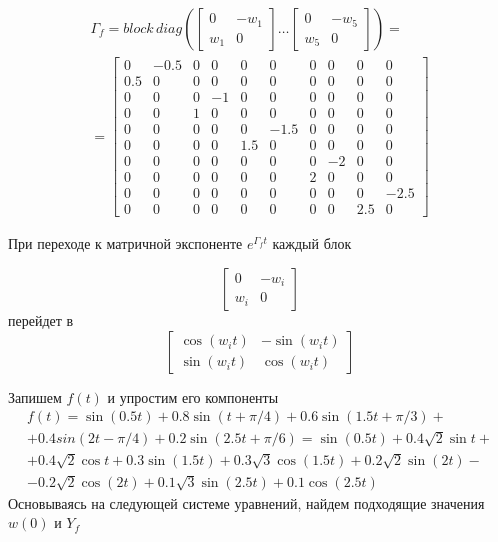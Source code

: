 \begin{multline}
    \Gamma_f = block \,diag \left( 
    \begin{bmatrix}
        0 & -w_1\\
        w_1 & 0
    \end{bmatrix}\dots 
    \begin{bmatrix}
        0 & -w_5\\
        w_5 & 0
    \end{bmatrix}
    \right) =\\[2ex]
    = \begin{bmatrix}
        0 & -0.5 & 0 & 0 & 0 & 0 & 0 & 0&0&0\\
        0.5 & 0 & 0 & 0 & 0 & 0 & 0 & 0&0&0\\
        0 & 0 & 0 & -1 & 0 & 0 & 0 & 0&0&0\\
        0 & 0 & 1 & 0 & 0 & 0 & 0 & 0&0&0\\
        0 & 0 & 0 & 0 & 0 & -1.5 & 0 & 0&0&0\\
        0 & 0 & 0 & 0 & 1.5 & 0 & 0 & 0&0&0\\
        0 & 0 & 0 & 0 & 0 & 0 & 0 & -2&0&0\\
        0 & 0 & 0 & 0 & 0 & 0 & 2 & 0&0&0\\
        0 & 0 & 0 & 0 & 0 & 0 & 0 & 0&0&-2.5\\
        0 & 0 & 0 & 0 & 0 & 0 & 0 & 0&2.5&0
    \end{bmatrix} 
\end{multline}

При переходе к матричной экспоненте $e^{\Gamma_f t}$ каждый блок 

\begin{equation}\begin{bmatrix}
        0 & -w_i\\
        w_i & 0
\end{bmatrix}\end{equation}
перейдет в 
\begin{equation}\begin{bmatrix}
        \cos (w_it) & -\sin (w_it)\\
        \sin (w_it) & \cos (w_it)
\end{bmatrix}
\end{equation}
    
Запишем $f(t)$ и упростим его компоненты
\begin{multline}
    f(t) = \sin (0.5t) + 0.8 \sin(t+\pi/4)+ 0.6 \sin (1.5 t+ \pi/3)+\\+0.4 sin(2t-\pi/4) + 0.2\sin(2.5t+\pi/6) =\sin (0.5t)+ 0.4\sqrt{2} \sin{t} +\\+ 0.4\sqrt{2} \cos{t} + 0.3 \sin(1.5t)+
    0.3 \sqrt{3} \cos(1.5t) + 0.2 \sqrt{2} \sin(2t) - \\-0.2\sqrt{2}\cos(2t) + 0.1 \sqrt{3} \sin(2.5t) + 0.1 \cos(2.5t)
\end{multline}
Основываясь на следующей системе уравнений, найдем подходящие значения $w(0)$ и $Y_f$


